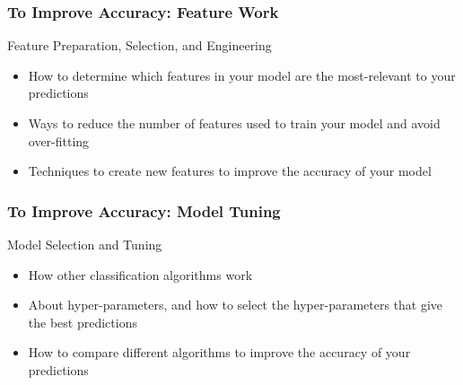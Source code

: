 \begin{frame}[fragile]\frametitle{To Improve Accuracy: Feature Work}
Feature Preparation, Selection, and Engineering
\begin{itemize}
\item How to determine which features in your model are the most-relevant to your predictions
\item Ways to reduce the number of features used to train your model and avoid over-fitting
\item Techniques to create new features to improve the accuracy of your model
\end{itemize}
\end{frame}

\begin{frame}[fragile]\frametitle{To Improve Accuracy: Model Tuning}
Model Selection and Tuning
\begin{itemize}
\item 
    How other classification algorithms work
\item About hyper-parameters, and how to select the hyper-parameters that give the best predictions
\item  How to compare different algorithms to improve the accuracy of your predictions
\end{itemize}
\end{frame}

